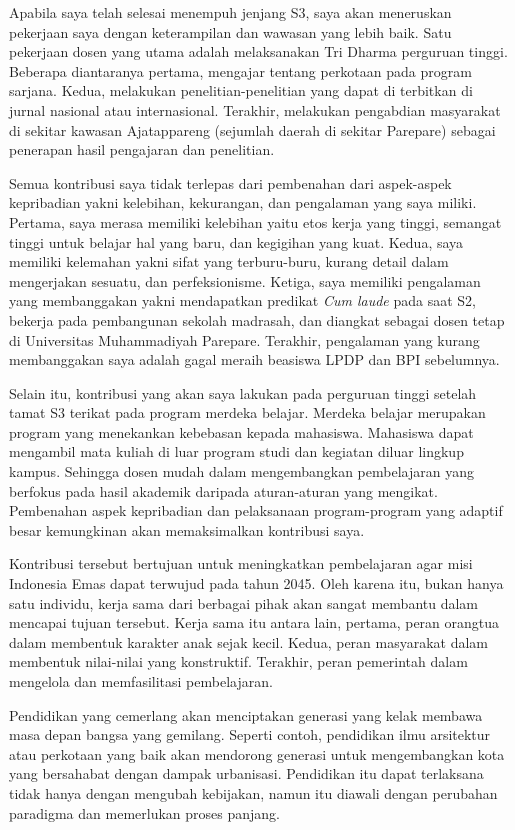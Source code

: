 \documentclass[../main.tex]{subfiles}
\begin{document}
Apabila saya telah selesai menempuh jenjang S3,
saya akan meneruskan pekerjaan saya dengan keterampilan dan wawasan yang lebih baik. Satu pekerjaan dosen yang utama adalah melaksanakan Tri Dharma perguruan tinggi. Beberapa diantaranya pertama, mengajar tentang perkotaan pada program sarjana. Kedua, melakukan penelitian-penelitian yang dapat di terbitkan di jurnal nasional atau internasional. Terakhir, melakukan pengabdian masyarakat di sekitar kawasan Ajatappareng (sejumlah daerah di sekitar Parepare) sebagai penerapan hasil pengajaran dan penelitian.

Semua kontribusi saya tidak terlepas dari pembenahan dari aspek-aspek kepribadian yakni kelebihan, kekurangan, dan pengalaman yang saya miliki.
Pertama, saya merasa memiliki kelebihan yaitu etos kerja yang tinggi, semangat tinggi untuk belajar hal yang baru, dan kegigihan yang kuat. Kedua, saya memiliki kelemahan yakni sifat yang terburu-buru, kurang detail dalam mengerjakan sesuatu, dan perfeksionisme.
Ketiga, saya memiliki pengalaman yang membanggakan yakni mendapatkan predikat \textit{Cum laude} pada saat S2, bekerja pada pembangunan sekolah madrasah, dan diangkat sebagai dosen tetap di Universitas Muhammadiyah Parepare. Terakhir, pengalaman yang kurang membanggakan saya adalah gagal meraih beasiswa LPDP dan BPI sebelumnya.

Selain itu, kontribusi yang akan saya lakukan pada perguruan tinggi setelah tamat S3 terikat pada program merdeka belajar.
Merdeka belajar merupakan program yang menekankan kebebasan kepada mahasiswa.
Mahasiswa dapat mengambil mata kuliah di luar program studi dan kegiatan diluar lingkup kampus.
Sehingga dosen mudah dalam mengembangkan pembelajaran yang berfokus pada hasil akademik daripada aturan-aturan yang mengikat. Pembenahan aspek kepribadian dan pelaksanaan program-program yang adaptif besar kemungkinan akan memaksimalkan kontribusi saya.

Kontribusi tersebut bertujuan untuk meningkatkan pembelajaran agar misi Indonesia Emas dapat terwujud pada tahun 2045. Oleh karena itu, bukan hanya satu individu, kerja sama dari berbagai pihak akan sangat membantu dalam mencapai tujuan tersebut.
Kerja sama itu antara lain, pertama, peran orangtua dalam membentuk karakter anak sejak kecil. Kedua, peran masyarakat dalam membentuk nilai-nilai yang konstruktif. Terakhir, peran pemerintah dalam mengelola dan memfasilitasi pembelajaran.

Pendidikan yang cemerlang akan menciptakan generasi yang kelak membawa masa depan bangsa yang gemilang.
Seperti contoh, pendidikan ilmu arsitektur atau perkotaan yang baik akan mendorong generasi untuk mengembangkan kota yang bersahabat dengan dampak urbanisasi.
Pendidikan itu dapat terlaksana tidak hanya dengan mengubah kebijakan, namun itu diawali dengan perubahan paradigma dan memerlukan proses panjang.
\end{document}
